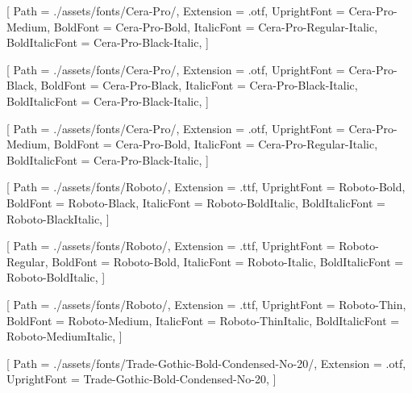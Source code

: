 
\setmainfont{Cera-Pro-Medium}[
Path = ./assets/fonts/Cera-Pro/,
Extension = .otf,
UprightFont = Cera-Pro-Medium,
BoldFont = Cera-Pro-Bold,
ItalicFont = Cera-Pro-Regular-Italic,
BoldItalicFont = Cera-Pro-Black-Italic,
]


[
    Path = ./assets/fonts/Cera-Pro/,
    Extension = .otf,
    UprightFont = Cera-Pro-Black,
    BoldFont = Cera-Pro-Black,
    ItalicFont = Cera-Pro-Black-Italic,
    BoldItalicFont = Cera-Pro-Black-Italic,
]

[
    Path = ./assets/fonts/Cera-Pro/,
    Extension = .otf,
    UprightFont = Cera-Pro-Medium,
    BoldFont = Cera-Pro-Bold,
    ItalicFont = Cera-Pro-Regular-Italic,
    BoldItalicFont = Cera-Pro-Black-Italic,
]

[
    Path = ./assets/fonts/Roboto/,
    Extension = .ttf,
    UprightFont = Roboto-Bold,
    BoldFont = Roboto-Black,
    ItalicFont = Roboto-BoldItalic,
    BoldItalicFont = Roboto-BlackItalic,
]

[
    Path = ./assets/fonts/Roboto/,
    Extension = .ttf,
    UprightFont = Roboto-Regular,
    BoldFont = Roboto-Bold,
    ItalicFont = Roboto-Italic,
    BoldItalicFont = Roboto-BoldItalic,
]

[
    Path = ./assets/fonts/Roboto/,
    Extension = .ttf,
    UprightFont = Roboto-Thin,
    BoldFont = Roboto-Medium,
    ItalicFont = Roboto-ThinItalic,
    BoldItalicFont = Roboto-MediumItalic,
]

[
    Path = ./assets/fonts/Trade-Gothic-Bold-Condensed-No-20/,
    Extension = .otf,
    UprightFont = Trade-Gothic-Bold-Condensed-No-20,
]

\let\resumeHeadingFont\cerapro
\let\resumeMetaFont\robotothin
